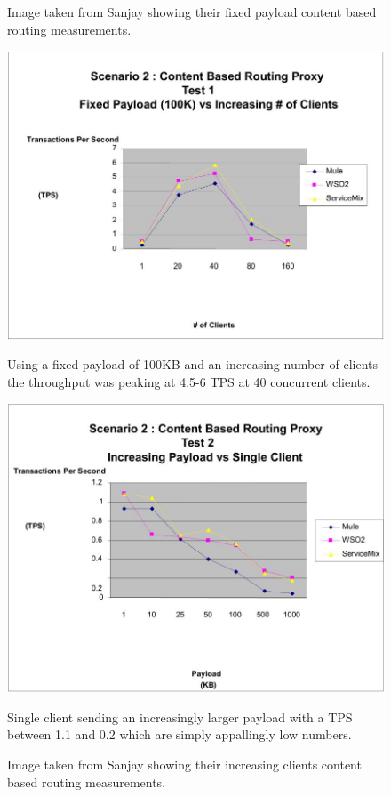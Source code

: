\newpage

\begin{figure}[H]
	\caption{Image taken from Sanjay \cite{Sanjay2011} showing their fixed payload content based routing measurements.}
	\centerline{\includegraphics[scale=0.43]{img/Sanjay_cbr_fixed_payload}}
	\label{fig:sanjay_cbr_fixed_payload}
	Using a fixed payload of 100KB and an increasing number of clients the throughput was peaking at 4.5-6 TPS at 40 concurrent clients.

	\caption{Image taken from Sanjay \cite{Sanjay2011} showing their increasing clients content based routing measurements.}
	\centerline{\includegraphics[scale=0.43]{img/Sanjay_cbr_increasing_payload}}
	\label{fig:sanjay_cbr_increasing_payload}
	Single client sending an increasingly larger payload with a TPS between 1.1 and 0.2 which are simply appallingly low numbers.
\end{figure}

